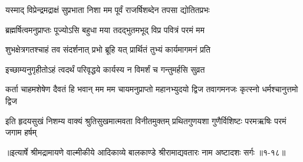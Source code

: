 \twolineshloka
{यस्माद् विप्रेन्द्रमद्राक्षं सुप्रभाता निशा मम}
{पूर्वं राजर्षिशब्देन तपसा द्योतितप्रभः} %

\twolineshloka
{ब्रह्मर्षित्वमनुप्राप्तः पूज्योऽसि बहुधा मया}
{तदद्भुतमभूद् विप्र पवित्रं परमं मम} %

\twolineshloka
{शुभक्षेत्रगतश्चाहं तव संदर्शनात् प्रभो}
{ब्रूहि यत् प्रार्थितं तुभ्यं कार्यमागमनं प्रति} %

\twolineshloka
{इच्छाम्यनुगृहीतोऽहं त्वदर्थं परिवृद्धये}
{कार्यस्य न विमर्शं च गन्तुमर्हसि सुव्रत} %

\threelineshloka
{कर्ता चाहमशेषेण दैवतं हि भवान् मम}
{मम चायमनुप्राप्तो महानभ्युदयो द्विज}
{तवागमनजः कृत्स्नो धर्मश्चानुत्तमो द्विज} %

\twolineshloka
{इति हृदयसुखं निशम्य वाक्यं श्रुतिसुखमात्मवता विनीतमुक्तम्}
{प्रथितगुणयशा गुणैर्विशिष्टः परमऋषिः परमं जगाम हर्षम्} %


॥इत्यार्षे श्रीमद्रामायणे वाल्मीकीये आदिकाव्ये बालकाण्डे श्रीरामाद्यवतारः नाम अष्टादशः सर्गः ॥१-१८॥
